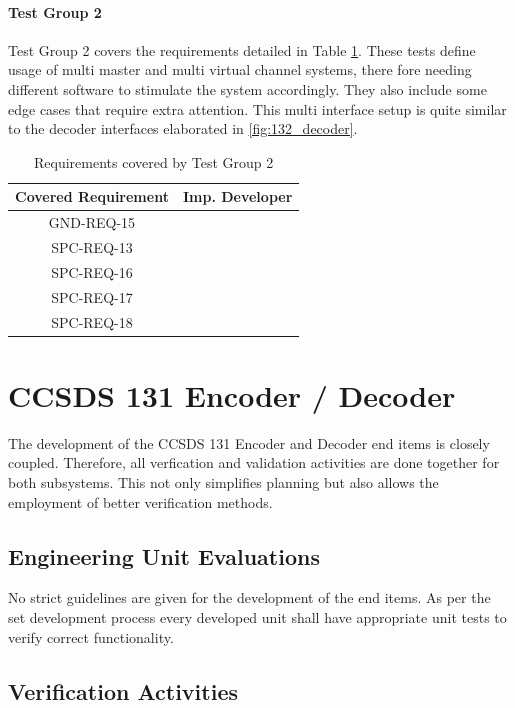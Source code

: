 \paragraph{Test Group 2}

Test Group 2 covers the requirements detailed in Table \ref{tab:req_test_grp_2}. These tests define usage of multi master and multi virtual channel systems, there fore needing different software to stimulate the system accordingly. They also include some edge cases that require extra attention. This multi interface setup is quite similar to the decoder interfaces elaborated in \autoref{fig:132_decoder}.

\begin{table}[h!]
	\begin{tabular}{|c|c|}
		\hline
		\textbf{Covered Requirement} & \textbf{Imp. Developer} \\
		\hline
		GND-REQ-15 & \\
		\hline
		SPC-REQ-13 & \\
		\hline
		SPC-REQ-16 & \\
		\hline
		SPC-REQ-17 & \\
		\hline
		SPC-REQ-18 & \\
		\hline
	\end{tabular}
	\caption{Requirements covered by Test Group 2}
	\label{tab:req_test_grp_2}
\end{table}


\section{CCSDS 131 Encoder / Decoder}

The development of the CCSDS 131 Encoder and Decoder end items is closely coupled. Therefore, all verfication and validation activities are done together for both subsystems. This not only simplifies planning but also allows the employment of better verification methods.

\subsection{Engineering Unit Evaluations}

No strict guidelines are given for the development of the end items. As per the set development process every developed unit shall have appropriate unit tests to verify correct functionality.

\subsection{Verification Activities}


